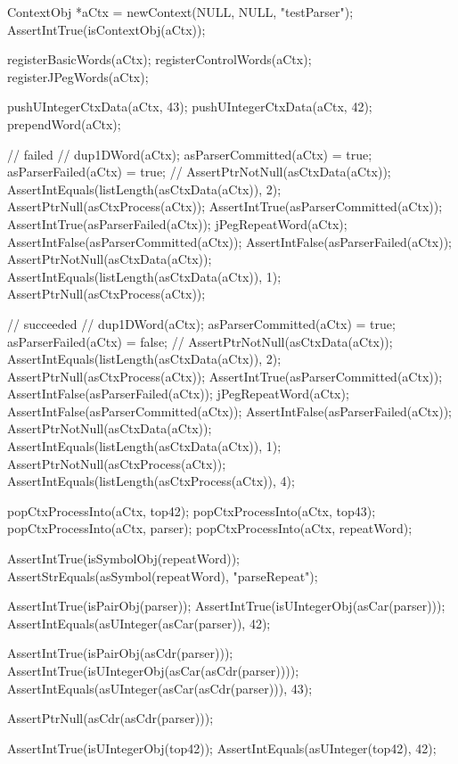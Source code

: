 
\startCTest
  ContextObj *aCtx = newContext(NULL, NULL, "testParser");
  AssertIntTrue(isContextObj(aCtx));
  
  registerBasicWords(aCtx);
  registerControlWords(aCtx);
  registerJPegWords(aCtx);
  
  pushUIntegerCtxData(aCtx, 43);
  pushUIntegerCtxData(aCtx, 42);
  prependWord(aCtx);

  // failed
  //
  dup1DWord(aCtx);
  asParserCommitted(aCtx) = true;
  asParserFailed(aCtx) = true;
  //
  AssertPtrNotNull(asCtxData(aCtx));
  AssertIntEquals(listLength(asCtxData(aCtx)), 2);
  AssertPtrNull(asCtxProcess(aCtx));
  AssertIntTrue(asParserCommitted(aCtx));
  AssertIntTrue(asParserFailed(aCtx));
  jPegRepeatWord(aCtx);
  AssertIntFalse(asParserCommitted(aCtx));
  AssertIntFalse(asParserFailed(aCtx));
  AssertPtrNotNull(asCtxData(aCtx));
  AssertIntEquals(listLength(asCtxData(aCtx)), 1);
  AssertPtrNull(asCtxProcess(aCtx));

  // succeeded
  //
  dup1DWord(aCtx);
  asParserCommitted(aCtx) = true;
  asParserFailed(aCtx) = false;
  //
  AssertPtrNotNull(asCtxData(aCtx));
  AssertIntEquals(listLength(asCtxData(aCtx)), 2);
  AssertPtrNull(asCtxProcess(aCtx));
  AssertIntTrue(asParserCommitted(aCtx));
  AssertIntFalse(asParserFailed(aCtx));
  jPegRepeatWord(aCtx);
  AssertIntFalse(asParserCommitted(aCtx));
  AssertIntFalse(asParserFailed(aCtx));
  AssertPtrNotNull(asCtxData(aCtx));
  AssertIntEquals(listLength(asCtxData(aCtx)), 1);
  AssertPtrNotNull(asCtxProcess(aCtx));
  AssertIntEquals(listLength(asCtxProcess(aCtx)), 4);
    
  popCtxProcessInto(aCtx, top42);
  popCtxProcessInto(aCtx, top43);
  popCtxProcessInto(aCtx, parser);
  popCtxProcessInto(aCtx, repeatWord);
  
  AssertIntTrue(isSymbolObj(repeatWord));
  AssertStrEquals(asSymbol(repeatWord), "parseRepeat");
  
  AssertIntTrue(isPairObj(parser));
  AssertIntTrue(isUIntegerObj(asCar(parser)));
  AssertIntEquals(asUInteger(asCar(parser)), 42);
  
  AssertIntTrue(isPairObj(asCdr(parser)));
  AssertIntTrue(isUIntegerObj(asCar(asCdr(parser))));
  AssertIntEquals(asUInteger(asCar(asCdr(parser))), 43);
  
  AssertPtrNull(asCdr(asCdr(parser)));
  
  AssertIntTrue(isUIntegerObj(top42));
  AssertIntEquals(asUInteger(top42), 42);  

